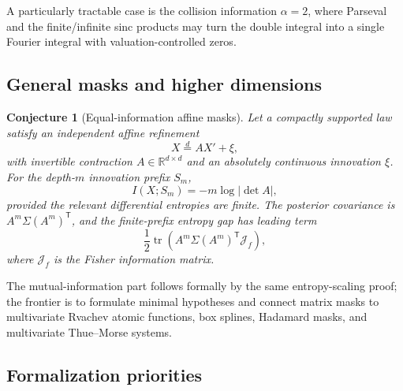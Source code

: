 \documentclass[11pt,oneside]{article}
\newtheorem{conjecture}[theorem]{Conjecture}
\theoremstyle{definition}
\theoremstyle{remark}
\newcommand{\R}{\mathbb R}
\begin{document}
A particularly tractable case is the collision information $\alpha=2$, where
Parseval and the finite/infinite sinc products may turn the double integral into a
single Fourier integral with valuation-controlled zeros.

\subsection{General masks and higher dimensions}

\begin{conjecture}[Equal-information affine masks]
\label{conj:general-mask}
Let a compactly supported law satisfy an independent affine refinement
\begin{equation}
 X\stackrel d=A X'+\xi,
 \label{eq:matrix-refinement}
\end{equation}
with invertible contraction $A\in\R^{d\times d}$ and an absolutely continuous
innovation $\xi$.  For the depth-$m$ innovation prefix $S_m$,
\begin{equation}
 I(X;S_m)=-m\log|\det A|,
 \label{eq:matrix-information}
\end{equation}
provided the relevant differential entropies are finite.  The posterior covariance
is $A^m\Sigma(A^m)^{\mathsf T}$, and the finite-prefix entropy gap has leading term
\begin{equation}
 \frac12\operatorname{tr}
 \left(A^m\Sigma(A^m)^{\mathsf T}\mathcal J_f\right),
 \label{eq:matrix-fisher-gap}
\end{equation}
where $\mathcal J_f$ is the Fisher information matrix.
\end{conjecture}

The mutual-information part follows formally by the same entropy-scaling proof;
the frontier is to formulate minimal hypotheses and connect matrix masks to
multivariate Rvachev atomic functions, box splines, Hadamard masks, and
multivariate Thue--Morse systems.

\subsection{Formalization priorities}
\end{document}
